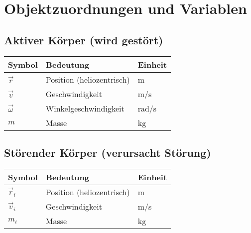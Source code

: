 \section{Objektzuordnungen und Variablen}
\subsection{Aktiver Körper (wird gestört)}
\begin{tabular}{|l|l|l|}
\hline
\textbf{Symbol} & \textbf{Bedeutung} & \textbf{Einheit} \\ \hline
$\vec{r}$ & Position (heliozentrisch) & m \\ \hline
$\vec{v}$ & Geschwindigkeit & m/s \\ \hline
$\vec{\omega}$ & Winkelgeschwindigkeit & rad/s \\ \hline
$m$ & Masse & kg \\ \hline
\end{tabular}

\subsection{Störender Körper (verursacht Störung)}
\begin{tabular}{|l|l|l|}
\hline
\textbf{Symbol} & \textbf{Bedeutung} & \textbf{Einheit} \\ \hline
$\vec{r}_i$ & Position (heliozentrisch) & m \\ \hline
$\vec{v}_i$ & Geschwindigkeit & m/s \\ \hline
$m_i$ & Masse & kg \\ \hline
\end{tabular}